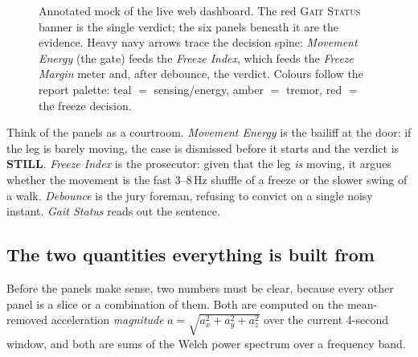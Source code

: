 \begin{figure}[htbp]
{}
\caption{Annotated mock of the live web dashboard. The red \textsc{Gait Status} banner
is the single verdict; the six panels beneath it are the evidence. Heavy navy arrows
trace the decision spine: \emph{Movement Energy} (the gate) feeds the \emph{Freeze
Index}, which feeds the \emph{Freeze Margin} meter and, after debounce, the verdict.
Colours follow the report palette: teal $=$ sensing/energy, amber $=$ tremor, red $=$
the freeze decision.}
\label{fig:dash-mock}
\end{figure}

\begin{intuition}
Think of the panels as a courtroom. \emph{Movement Energy} is the bailiff at the door:
if the leg is barely moving, the case is dismissed before it starts and the verdict is
\textbf{STILL}. \emph{Freeze Index} is the prosecutor: given that the leg \emph{is}
moving, it argues whether the movement is the fast 3--8\,Hz shuffle of a freeze or the
slower swing of a walk. \emph{Debounce} is the jury foreman, refusing to convict on a
single noisy instant. \emph{Gait Status} reads out the sentence.
\end{intuition}

\subsection{The two quantities everything is built from}

Before the panels make sense, two numbers must be clear, because every other panel is a
slice or a combination of them. Both are computed on the mean-removed acceleration
\emph{magnitude} $a=\sqrt{a_x^2+a_y^2+a_z^2}$ over the current 4-second window, and both
are sums of the Welch power spectrum over a frequency band.

